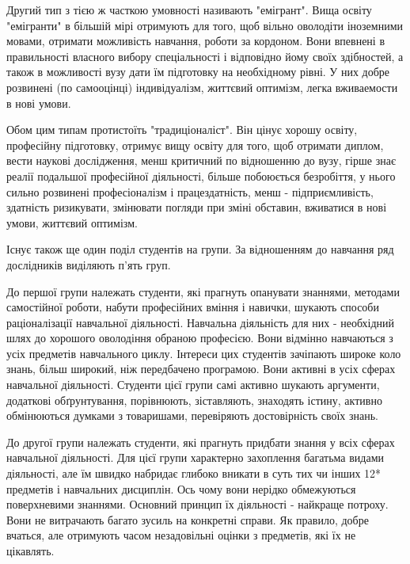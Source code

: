 \documentclass[a4paper,12pt, titlepage]{article}
\begin{document}
    Другий тип з тією ж часткою умовності називають "емігрант". Вища
    освіту "емігранти" в більшій мірі отримують для того, щоб
    вільно оволодіти іноземними мовами, отримати можливість навчання,
    роботи за кордоном. Вони впевнені в правильності власного вибору
    спеціальності і відповідно йому своїх здібностей, а також в
    можливості вузу дати їм підготовку на необхідному рівні. У них добре
    розвинені (по самооцінці) індивідуалізм, життєвий оптимізм, легка
    вживаемости в нові умови.

    Обом цим типам протистоїть "традиціоналіст". Він цінує хорошу
    освіту, професійну підготовку, отримує вищу освіту
    для того, щоб отримати диплом, вести наукові дослідження, менш
    критичний по відношенню до вузу, гірше знає реалії подальшої
    професійної діяльності, більше побоюється безробіття, у нього
    сильно розвинені професіоналізм і працездатність, менш -
    підприємливість, здатність ризикувати, змінювати погляди при зміні
    обставин, вживатися в нові умови, життєвий оптимізм.

    Існує також ще один поділ студентів на групи. За
    відношенням до навчання ряд дослідників виділяють п'ять груп.

    До першої групи належать студенти, які прагнуть опанувати
    знаннями, методами самостійної роботи, набути професійних
    вміння і навички, шукають способи раціоналізації навчальної діяльності.
    Навчальна діяльність для них - необхідний шлях до хорошого оволодіння
    обраною професією. Вони відмінно навчаються з усіх предметів навчального
    циклу. Інтереси цих студентів зачіпають широке коло знань, більш
    широкий, ніж передбачено програмою. Вони активні в усіх сферах
    навчальної діяльності. Студенти цієї групи самі активно шукають аргументи,
    додаткові обґрунтування, порівнюють, зіставляють, знаходять істину,
    активно обмінюються думками з товаришами, перевіряють достовірність
    своїх знань.

    До другої групи належать студенти, які прагнуть придбати
    знання у всіх сферах навчальної діяльності. Для цієї групи характерно
    захоплення багатьма видами діяльності, але їм швидко набридає глибоко
    вникати в суть тих чи інших 12* предметів і навчальних дисциплін. Ось
    чому вони нерідко обмежуються поверхневими знаннями. Основний
    принцип їх діяльності - найкраще потроху. Вони не витрачають
    багато зусиль на конкретні справи. Як правило, добре вчаться, але отримують
    часом незадовільні оцінки з предметів, які їх не
    цікавлять.
\end{document}
